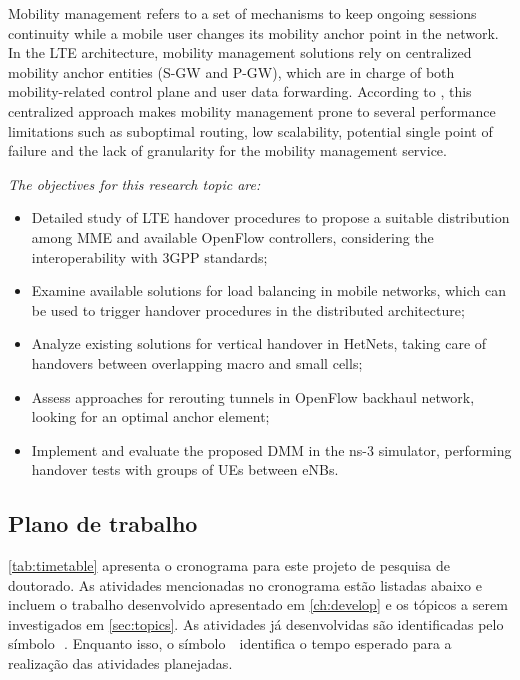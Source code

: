 Mobility management refers to a set of mechanisms to keep ongoing sessions
continuity while a mobile user changes its mobility anchor point in the
network. In the \ac{LTE} architecture, mobility management solutions rely on
centralized mobility anchor entities (\ac{S-GW} and \ac{P-GW}), which are in
charge of both mobility-related control plane and user data forwarding.
According to \citet{Valtulina2014}, this centralized approach makes mobility
management prone to several performance limitations such as suboptimal
routing, low scalability, potential single point of failure and the lack of
granularity for the mobility management service.

\emph{The objectives for this research topic are:}
\begin{itemize}
  \item Detailed study of \ac{LTE} handover procedures to propose a suitable
  distribution among \ac{MME} and available OpenFlow controllers, considering
  the interoperability with \ac{3GPP} standards;

  \item Examine available solutions for load balancing in mobile networks,
  which can be used to trigger handover procedures in the distributed
  architecture;

  \item Analyze existing solutions for vertical handover in \acp{HetNet},
  taking care of handovers between overlapping macro and small cells;

  \item Assess approaches for rerouting tunnels in OpenFlow backhaul network,
  looking for an optimal anchor element;

  \item Implement and evaluate the proposed \ac{DMM} in the \ac{ns-3}
  simulator, performing handover tests with groups of \acp{UE} between
  \acp{eNB}.
\end{itemize}


\subsection{Plano de trabalho}
\label{sec:timetable}


\autoref{tab:timetable} apresenta o cronograma para este projeto de pesquisa de doutorado. As atividades mencionadas no cronograma estão listadas abaixo e incluem o trabalho desenvolvido apresentado em \autoref{ch:develop} e os tópicos a serem investigados em \autoref{sec:topics}. As atividades já desenvolvidas são identificadas pelo símbolo~\,\m. Enquanto isso, o símbolo \,\x\ identifica o tempo esperado para a realização das atividades planejadas.

